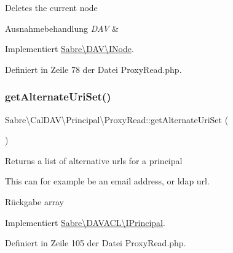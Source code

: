 Deletes the current node


\begin{DoxyExceptions}{Ausnahmebehandlung}
{\em D\+AV} & \\
\hline
\end{DoxyExceptions}


Implementiert \mbox{\hyperlink{interface_sabre_1_1_d_a_v_1_1_i_node_a72cd0ee4e36dfced2b0412d14dbd73e6}{Sabre\textbackslash{}\+D\+A\+V\textbackslash{}\+I\+Node}}.



Definiert in Zeile 78 der Datei Proxy\+Read.\+php.

\mbox{\label{class_sabre_1_1_cal_d_a_v_1_1_principal_1_1_proxy_read_a110ccaf5f2e2a9c366280f9d7627ff7f}} 
\subsubsection{\texorpdfstring{get\+Alternate\+Uri\+Set()}{getAlternateUriSet()}}
{\footnotesize\ttfamily Sabre\textbackslash{}\+Cal\+D\+A\+V\textbackslash{}\+Principal\textbackslash{}\+Proxy\+Read\+::get\+Alternate\+Uri\+Set (\begin{DoxyParamCaption}{ }\end{DoxyParamCaption})}

Returns a list of alternative urls for a principal

This can for example be an email address, or ldap url.

\begin{DoxyReturn}{Rückgabe}
array 
\end{DoxyReturn}


Implementiert \mbox{\hyperlink{interface_sabre_1_1_d_a_v_a_c_l_1_1_i_principal_ac28ebb97541a792d73dd4e15d3b8cdb6}{Sabre\textbackslash{}\+D\+A\+V\+A\+C\+L\textbackslash{}\+I\+Principal}}.



Definiert in Zeile 105 der Datei Proxy\+Read.\+php.

\mbox{\label{class_sabre_1_1_cal_d_a_v_1_1_principal_1_1_proxy_read_a1ffd1507b94784b82a2289a677d40eb0}} 
